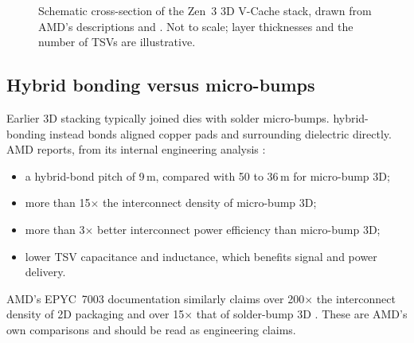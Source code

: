 \begin{figure}[htbp]
\caption[Cross-section of the Zen~3 3D V-Cache stack]{Schematic cross-section of the Zen~3 3D V-Cache stack, drawn from AMD's descriptions \cite[slides~10--12, 14, 16--17]{wuu2022vcache} and \cite{amd2022epyc7003}. Not to scale; layer thicknesses and the number of TSVs are illustrative.}
\label{fig:vcache-stack}
\end{figure}

\subsection{Hybrid bonding versus micro-bumps}
Earlier 3D stacking typically joined dies with solder \glspl{micro-bump}. \Gls{hybrid-bonding} instead bonds aligned copper pads and surrounding dielectric directly. AMD reports, from its internal engineering analysis \cite{swaminathanAdvancedPackagingEnabling2021}:
\begin{itemize}
  \item a hybrid-bond pitch of 9\,\textmu m, compared with 50 to 36\,\textmu m for micro-bump 3D;
  \item more than 15$\times$ the interconnect density of micro-bump 3D;
  \item more than 3$\times$ better interconnect power efficiency than micro-bump 3D;
  \item lower TSV capacitance and inductance, which benefits signal and power delivery.
\end{itemize}
AMD's EPYC~7003 documentation similarly claims over 200$\times$ the interconnect density of 2D packaging and over 15$\times$ that of solder-bump 3D \cite{amd2022epyc7003}. These are AMD's own comparisons and should be read as engineering claims.

